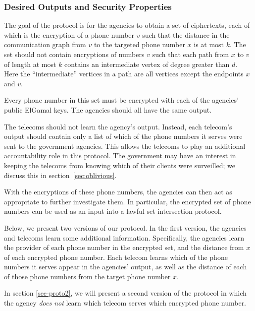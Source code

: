 \subsubsection{Desired Outputs and Security Properties}



The goal of the protocol is for the agencies to obtain a set of ciphertexts, each of which is the encryption of a phone number $v$ such that the distance in the communication graph from $v$ to the targeted phone number $x$ is at most $k$. The set should not contain encryptions of numbers $v$ such that each path from $x$ to $v$ of length at most $k$ contains an intermediate vertex of degree greater than $d$. Here the ``intermediate'' vertices in a path are all vertices except the endpoints $x$ and $v$.



Every phone number in this set must be encrypted with each of the agencies' public ElGamal keys. The agencies should all have the same output.



The telecoms should not learn the agency's output. Instead, each telecom's output should contain only a list of which of the phone numbers it serves were sent to the government agencies. This allows the telecoms to play an additional accountability role in this protocol. The government may have an interest in keeping the telecoms from knowing which of their clients were surveilled; we discuss this in section~\ref{sec:oblivious}.



With the encryptions of these phone numbers, the agencies can then act as appropriate to further investigate them. In particular, the encrypted set of phone numbers can be used as an input into a lawful set intersection protocol.




Below, we present two versions of our protocol. In the first version, the agencies and telecoms learn some additional information. Specifically, the agencies learn the provider of each phone number in the encrypted set, and the distance from $x$ of each encrypted phone number. Each telecom learns which of the phone numbers it serves appear in the agencies' output, as well as the distance of each of those phone numbers from the target phone number $x$.



In section \ref{sec-proto2}, we will present a second version of the protocol in which the agency \emph{does not} learn which telecom serves which encrypted phone number.


